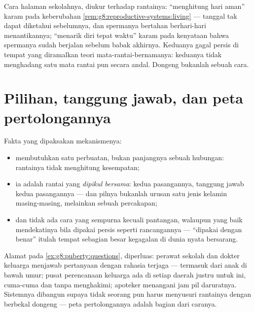 \begin{remark}\label{rem:g8:contraception:notwork}
Cara halaman sekolahnya, diukur terhadap rantainya:
``menghitung hari aman'' karam pada keberubahan
\cref{rem:g8:reproductive-systems:living} --- tanggal
 tak dapat diketahui sebelumnya, dan spermanya
bertahan berhari-hari menantikannya; ``menarik diri tepat
waktu'' karam pada kenyataan bahwa spermanya sudah berjalan
sebelum babak akhirnya. Keduanya gagal persis di tempat yang
diramalkan teori mata-rantai-bernamanya: keduanya tidak
menghadang satu mata rantai pun secara andal. Dongeng
bukanlah sebuah cara.
\end{remark}

\section{Pilihan, tanggung jawab, dan peta pertolongannya}

\begin{proposition}\label{prop:g8:contraception:choice}
Fakta yang dipaksakan mekanismenya:
\begin{itemize}
  \item {} membutuhkan satu perbuatan, bukan
        panjangnya sebuah hubungan: rantainya tidak
        menghitung kesempatan;
  \item ia adalah rantai yang \emph{dipikul bersama}: 
        kedua pasangannya, tanggung jawab kedua pasangannya
        ---  dan pilnya bukanlah urusan satu jenis
        kelamin masing-masing, melainkan sebuah percakapan;
  \item dan tidak ada cara yang sempurna kecuali pantangan,
        walaupun yang baik mendekatinya bila dipakai persis
        seperti rancangannya --- ``dipakai dengan benar''
        itulah tempat sebagian besar kegagalan di dunia
        nyata bersarang.
\end{itemize}
\end{proposition}
\admitted

\begin{example}\label{ex:g8:contraception:help}
Alamat pada \cref{ex:g8:puberty:questions}, diperluas:
perawat sekolah dan dokter keluarga menjawab pertanyaan
 dengan rahasia terjaga --- termasuk dari anak di
bawah umur; pusat perencanaan keluarga ada di setiap daerah
justru untuk ini, cuma-cuma dan tanpa menghakimi; apoteker
menangani jam pil daruratnya. Sistemnya dibangun supaya
tidak seorang pun harus menyusuri rantainya dengan berbekal
dongeng --- peta pertolongannya adalah bagian dari caranya.
\end{example}

